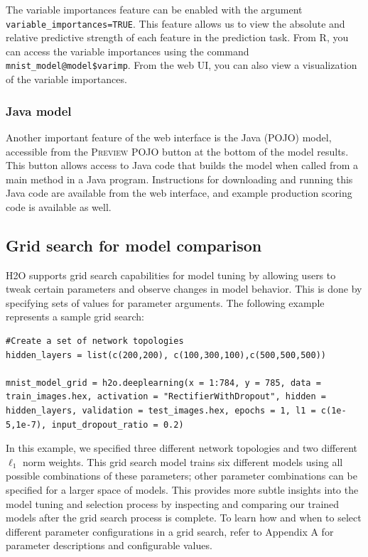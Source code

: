 \documentclass{article}[11pt]
\begin{document}
The variable importances feature can be enabled with the argument \texttt{variable\_importances=TRUE}. This feature allows us to view the absolute and relative predictive strength of each feature in the prediction task. From R, you can access the variable importances using the command \\
 \texttt{mnist\_model@model\$varimp}. From the web UI, you can also view a visualization of the variable importances.

\subsubsection{Java model} 

Another important feature of the web interface is the Java (POJO) model, accessible from the \textsc{Preview POJO} button at the bottom of the model results. This button allows access to Java code that builds the model when called from a main method in a Java program. Instructions for downloading and running this Java code are available from the web interface, and example production scoring code is available as well.

\subsection{Grid search for model comparison} 

H2O supports grid search capabilities for model tuning by allowing users to tweak certain parameters and observe changes in model behavior. This is done by specifying sets of values for parameter arguments. The following example represents a sample grid search:

\begin{lstlisting}[breaklines,basicstyle=\ttfamily]
#Create a set of network topologies
hidden_layers = list(c(200,200), c(100,300,100),c(500,500,500))

mnist_model_grid = h2o.deeplearning(x = 1:784, y = 785, data = train_images.hex, activation = "RectifierWithDropout", hidden = hidden_layers, validation = test_images.hex, epochs = 1, l1 = c(1e-5,1e-7), input_dropout_ratio = 0.2)

\end{lstlisting}
\normalsize
\noindent
In this example, we specified three different network topologies and two different $\ell_1$ norm weights. This grid search model trains six different models using all possible combinations of these parameters; other parameter combinations can be specified for a larger space of models. This provides more subtle insights into the model tuning and selection process by inspecting and comparing our trained models after the grid search process is complete. To learn how and when to select different parameter configurations in a grid search, refer to Appendix A for parameter descriptions and configurable values.
\end{document}

